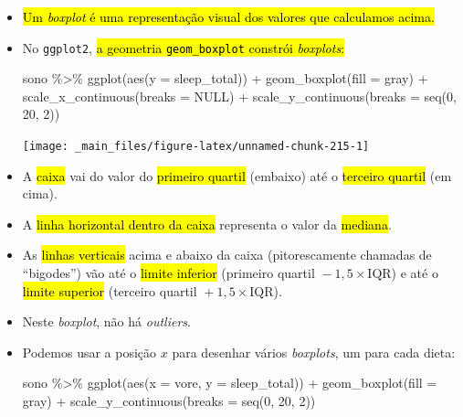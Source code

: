 \documentclass[
  11pt]{report}
\newenvironment{Shaded}{\begin{snugshade}}{\end{snugshade}}
\newcommand{\AttributeTok}[1]{\textcolor[rgb]{0.77,0.63,0.00}{#1}}
\newcommand{\ConstantTok}[1]{\textcolor[rgb]{0.00,0.00,0.00}{#1}}
\newcommand{\DecValTok}[1]{\textcolor[rgb]{0.00,0.00,0.81}{#1}}
\newcommand{\FunctionTok}[1]{\textcolor[rgb]{0.00,0.00,0.00}{#1}}
\newcommand{\NormalTok}[1]{#1}
\newcommand{\SpecialCharTok}[1]{\textcolor[rgb]{0.00,0.00,0.00}{#1}}
\newcommand{\StringTok}[1]{\textcolor[rgb]{0.31,0.60,0.02}{#1}}
\renewenvironment{Shaded}{
    \begin{mdframed}[%
      roundcorner=2pt,%
      innerleftmargin=5pt,%
      innerrightmargin=5pt,%
      topline=true,%
      leftline=true,%
      rightline=true,%
      bottomline=true,%
      linewidth=0.5pt,%
      linecolor=black!20,%
      backgroundcolor=black!2,%
      skipabove=2ex,%
      skipbelow=2.5ex%
    ]%
  }
  {
    \end{mdframed}
  }
\begin{document}
\begin{itemize}
\item
  {\hl{Um \emph{boxplot} é uma representação visual dos valores que calculamos acima.}}
\item
  No \texttt{ggplot2}, {\hl{a geometria {\mbox{\texttt{geom\_boxplot}}} constrói \emph{boxplots}:}}

\begin{Shaded}
\begin{Highlighting}[]
\NormalTok{sono }\SpecialCharTok{\%\textgreater{}\%} 
  \FunctionTok{ggplot}\NormalTok{(}\FunctionTok{aes}\NormalTok{(}\AttributeTok{y =}\NormalTok{ sleep\_total)) }\SpecialCharTok{+}
    \FunctionTok{geom\_boxplot}\NormalTok{(}\AttributeTok{fill =} \StringTok{\textquotesingle{}gray\textquotesingle{}}\NormalTok{) }\SpecialCharTok{+}
    \FunctionTok{scale\_x\_continuous}\NormalTok{(}\AttributeTok{breaks =} \ConstantTok{NULL}\NormalTok{) }\SpecialCharTok{+}
    \FunctionTok{scale\_y\_continuous}\NormalTok{(}\AttributeTok{breaks =} \FunctionTok{seq}\NormalTok{(}\DecValTok{0}\NormalTok{, }\DecValTok{20}\NormalTok{, }\DecValTok{2}\NormalTok{))}
\end{Highlighting}
\end{Shaded}

  \begin{center}\texttt{[image: \_main\_files/figure-latex/unnamed-chunk-215-1]} \end{center}
\item
  A {\hl{caixa}} vai do valor do {\hl{primeiro quartil}} (embaixo) até o {\hl{terceiro quartil}} (em cima).
\item
  A {\hl{linha horizontal dentro da caixa}} representa o valor da {\hl{mediana}}.
\item
  As {\hl{linhas verticais}} acima e abaixo da caixa (pitorescamente chamadas de ``bigodes'') vão até o {\hl{limite inferior}} (primeiro quartil ${}- 1{,}5 \times \text{IQR}$) e até o {\hl{limite superior}} (terceiro quartil ${}+ 1{,}5 \times \text{IQR}$).
\item
  Neste \emph{boxplot}, não há \emph{outliers}.
\item
  \protect\hypertarget{onivoros}{}{} Podemos usar a posição $x$ para desenhar vários \emph{boxplots}, um para cada dieta:

\begin{Shaded}
\begin{Highlighting}[]
\NormalTok{sono }\SpecialCharTok{\%\textgreater{}\%} 
  \FunctionTok{ggplot}\NormalTok{(}\FunctionTok{aes}\NormalTok{(}\AttributeTok{x =}\NormalTok{ vore, }\AttributeTok{y =}\NormalTok{ sleep\_total)) }\SpecialCharTok{+}
    \FunctionTok{geom\_boxplot}\NormalTok{(}\AttributeTok{fill =} \StringTok{\textquotesingle{}gray\textquotesingle{}}\NormalTok{) }\SpecialCharTok{+}
    \FunctionTok{scale\_y\_continuous}\NormalTok{(}\AttributeTok{breaks =} \FunctionTok{seq}\NormalTok{(}\DecValTok{0}\NormalTok{, }\DecValTok{20}\NormalTok{, }\DecValTok{2}\NormalTok{))}
\end{Highlighting}
\end{Shaded}


\end{itemize}
\end{document}
